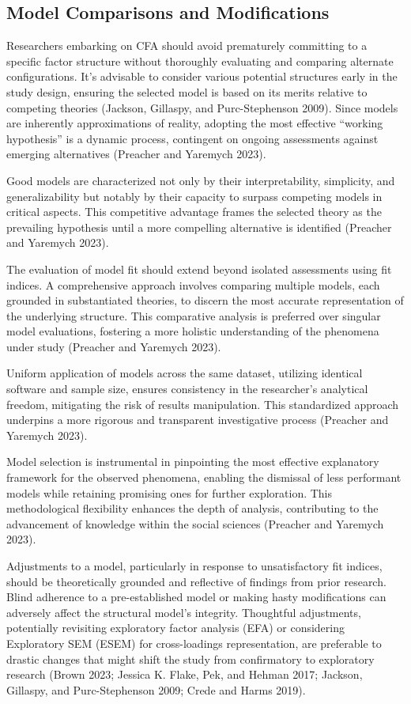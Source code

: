 \documentclass[
  a4paper,
]{article}
\begin{document}
\subsection{Model Comparisons and
Modifications}\label{model-comparisons-and-modifications}

Researchers embarking on CFA should avoid prematurely committing to a
specific factor structure without thoroughly evaluating and comparing
alternate configurations. It's advisable to consider various potential
structures early in the study design, ensuring the selected model is
based on its merits relative to competing theories (Jackson, Gillaspy,
and Purc-Stephenson 2009). Since models are inherently approximations of
reality, adopting the most effective ``working hypothesis'' is a dynamic
process, contingent on ongoing assessments against emerging alternatives
(Preacher and Yaremych 2023).

Good models are characterized not only by their interpretability,
simplicity, and generalizability but notably by their capacity to
surpass competing models in critical aspects. This competitive advantage
frames the selected theory as the prevailing hypothesis until a more
compelling alternative is identified (Preacher and Yaremych 2023).

The evaluation of model fit should extend beyond isolated assessments
using fit indices. A comprehensive approach involves comparing multiple
models, each grounded in substantiated theories, to discern the most
accurate representation of the underlying structure. This comparative
analysis is preferred over singular model evaluations, fostering a more
holistic understanding of the phenomena under study (Preacher and
Yaremych 2023).

Uniform application of models across the same dataset, utilizing
identical software and sample size, ensures consistency in the
researcher's analytical freedom, mitigating the risk of results
manipulation. This standardized approach underpins a more rigorous and
transparent investigative process (Preacher and Yaremych 2023).

Model selection is instrumental in pinpointing the most effective
explanatory framework for the observed phenomena, enabling the dismissal
of less performant models while retaining promising ones for further
exploration. This methodological flexibility enhances the depth of
analysis, contributing to the advancement of knowledge within the social
sciences (Preacher and Yaremych 2023).

Adjustments to a model, particularly in response to unsatisfactory fit
indices, should be theoretically grounded and reflective of findings
from prior research. Blind adherence to a pre-established model or
making hasty modifications can adversely affect the structural model's
integrity. Thoughtful adjustments, potentially revisiting exploratory
factor analysis (EFA) or considering Exploratory SEM (ESEM) for
cross-loadings representation, are preferable to drastic changes that
might shift the study from confirmatory to exploratory research (Brown
2023; Jessica K. Flake, Pek, and Hehman 2017; Jackson, Gillaspy, and
Purc-Stephenson 2009; Crede and Harms 2019).
\end{document}
